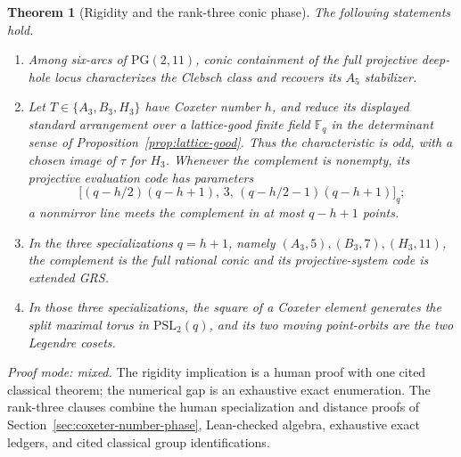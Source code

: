 \documentclass[11pt]{article}
\newtheorem{theorem}{Theorem}[section]
\theoremstyle{definition}
\theoremstyle{remark}
\newcommand{\PG}{\mathrm{PG}}
\newcommand{\F}{\mathbb{F}}
\begin{document}
\begin{theorem}[Rigidity and the rank-three conic phase]
\label{thm:headline-rigidity-phase}
The following statements hold.
\begin{enumerate}[label=\textup{(A\arabic*)},leftmargin=*]
\item Among six-arcs of $\PG(2,11)$, conic containment of the full
projective deep-hole locus characterizes the Clebsch class and recovers its
$A_5$ stabilizer.
\item Let $T\in\{A_3,B_3,H_3\}$ have Coxeter number $h$, and reduce its
displayed standard arrangement over a lattice-good finite field $\F_q$ in
the determinant sense of Proposition~\ref{prop:lattice-good}.  Thus the
characteristic is odd, with a chosen image of $\tau$ for $H_3$.  Whenever
the complement is nonempty, its projective evaluation code has parameters
\[
 \bigl[(q-h/2)(q-h+1),\,3,\,
       (q-h/2-1)(q-h+1)\bigr]_q;
\]
a nonmirror line meets the complement in at most $q-h+1$ points.
\item In the three specializations $q=h+1$, namely
$(A_3,5),(B_3,7),(H_3,11)$, the complement is the full rational conic and
its projective-system code is extended GRS.
\item In those three specializations, the square of a Coxeter element
generates the split maximal torus in $\mathrm{PSL}_2(q)$, and its two
moving point-orbits are the two Legendre cosets.
\end{enumerate}
\end{theorem}
\noindent\emph{Proof mode: mixed.}  The rigidity implication is a human
proof with one cited classical theorem; the numerical gap is an exhaustive
exact enumeration.
The rank-three clauses combine the human specialization and distance
proofs of Section~\ref{sec:coxeter-number-phase}, Lean-checked algebra,
exhaustive exact ledgers, and cited classical group identifications.
\end{document}
